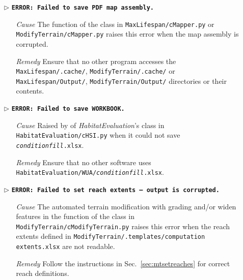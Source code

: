 \begin{itemize}
	\item[$\triangleright$]\textbf{\texttt{ERROR: Failed to save PDF map assembly.}}
	\begin{itemize}
		\item[\textit{Cause}\hspace{0.27cm}] The  function of the  class in \texttt{MaxLifespan/cMapper.py} or \texttt{ModifyTerrain/cMapper.py} raises this error when the map assembly is corrupted.
		\item[\textit{Remedy}] Ensure that no other program accesses the \texttt{MaxLifespan/.cache/}, \texttt{ModifyTerrain/.cache/} or \texttt{MaxLifespan/Output/}, \texttt{ModifyTerrain/Output/} directories or their contents.\\
	\end{itemize}
	
	\item[$\triangleright$]\textbf{\texttt{ERROR: Failed to save WORKBOOK.}}
	\begin{itemize}
		\item[\textit{Cause}\hspace{0.27cm}] Raised by  of \textit{HabitatEvaluation}'s  class in \texttt{HabitatEvaluation/cHSI.py} when it could not save \texttt{\textit{condition}{\myUnderscore}\textit{fill}.xlsx}.
		\item[\textit{Remedy}] Ensure that no other software uses \texttt{HabitatEvaluation/WUA/\texttt{\textit{condition}{\myUnderscore}\textit{fill}.xlsx}}.\\
	\end{itemize}
	
	\item[$\triangleright$]\textbf{\texttt{ERROR: Failed to set reach extents -- output is corrupted.}}
	\begin{itemize}
		\item[\textit{Cause}\hspace{0.27cm}] The automated terrain modification with grading and/or widen features in the  function of the  class in \texttt{ModifyTerrain/cModifyTerrain.py} raises this error when the reach extents defined in \texttt{ModifyTerrain/.templates/computation {\myUnderscore}extents.xlsx} are not readable.
		\item[\textit{Remedy}] Follow the instructions in Sec.~\ref{sec:mtsetreaches} for correct reach definitions.\\
	\end{itemize}
	

\end{itemize}
